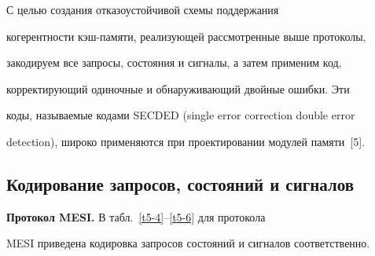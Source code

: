      С целью  создания отказоустойчивой схемы поддержания 


когерентности кэш-па\-мя\-ти, реализующей рассмотренные выше протоколы, 


закодируем все запросы, состояния и сигналы, а затем применим код, 


корректирующий одиночные и обнаруживающий двойные ошибки. Эти 


коды, называемые кодами SECDED (single error correction double error 


detection), широко применяются при проектировании модулей памяти~[5].


      


\subsection{Кодирование запросов, состояний и сигналов} %





      \textbf{Протокол MESI.} В табл.~\ref{t5-4}--\ref{t5-6}  для протокола 


MESI приведена кодировка запросов состояний и сигналов соответственно. 





